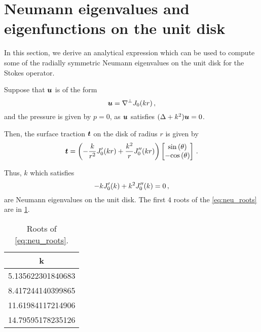 \section{Neumann eigenvalues and eigenfunctions on the unit disk}
In this section, we derive an analytical expression which
can be used to compute some of the radially symmetric 
Neumann eigenvalues on the unit disk for the Stokes operator.

Suppose that ${\boldsymbol u}$ is of the form
\begin{equation}
{\boldsymbol u} = \nabla^{\perp} J_{0}(kr) \, ,
\end{equation}
and the pressure is given by $p=0$, as
${\boldsymbol u}$ satisfies $(\Delta + k^2){\boldsymbol u} = 0$.

Then, the surface traction ${\boldsymbol t}$ on the disk of radius $r$ 
is given by
\begin{equation}
{\boldsymbol t} = 
\left( -\frac{k}{r^2}J_{0}'(kr)  + \frac{k^2}{r} J_{0}''(kr)\right)
\begin{bmatrix}
{\sin{(\theta)}} \\
-{\cos{(\theta)}}
\end{bmatrix} \, .
\end{equation}

Thus, $k$ which satisfies
\begin{equation}
  \label{eq:neu_roots}
-k J_{0}'(k) + k^2 J_{0}''(k) = 0 \, ,
\end{equation}
are Neumann eigenvalues on the unit disk.
The first $4$ roots of the \cref{eq:neu_roots} are
in \cref{tab:neu_roots}.
\begin{table}
  \centering
  \begin{tabular}{c}
    k  \\ \hline
    5.135622301840683 \\
    8.417244140399865 \\
    11.61984117214906 \\
    14.79595178235126 
  \end{tabular}
  \caption{Roots of \cref{eq:neu_roots}.}
  \label{tab:neu_roots}
\end{table}

